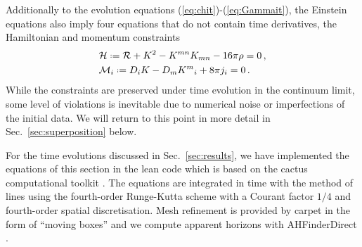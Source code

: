 \documentclass[]{iopart}
\newcommand*{\defeq}{\mathrel{\vcenter{\baselineskip0.5ex \lineskiplimit0pt
                     \hbox{\scriptsize.}\hbox{\scriptsize.}}}%
                     =}
\begin{document}
Additionally to the evolution equations (\ref{eq:chit})-(\ref{eq:Gammait}),
the Einstein equations also imply four equations that do not contain
time derivatives, the Hamiltonian and momentum constraints
%
\begin{align}
  &\mathcal{H} \defeq \mathcal{R}+K^2-K^{mn}K_{mn} - 16\pi \rho = 0\,,
  \label{eq:ham} \\
  &\mathcal{M}_i\defeq D_i K - D_m K^m{}_i + 8\pi j_i = 0\,.
  \label{eq:mom}
\end{align}
%
While the constraints are preserved under time evolution in the
continuum limit, some level of violations is inevitable due to
numerical noise or imperfections of the initial data. We will return
to this point in more detail in Sec.~\ref{sec:superposition} below.

For the time evolutions discussed in Sec.~\ref{sec:results}, we
have implemented the equations of this section in the {\sc lean}
code \cite{Sperhake:2006cy} which is based on the {\sc cactus}
computational toolkit \cite{Allen:1999}. The equations are integrated
in time with the method of lines using the fourth-order Runge-Kutta
scheme with a Courant factor $1/4$ and fourth-order spatial
discretisation. Mesh refinement is provided by {\sc carpet}
\cite{Schnetter:2003rb} in the form of ``moving boxes'' and we
compute apparent horizons with {\sc AHFinderDirect}
\cite{Thornburg:1995cp,Thornburg:2003sf}.

\end{document}

